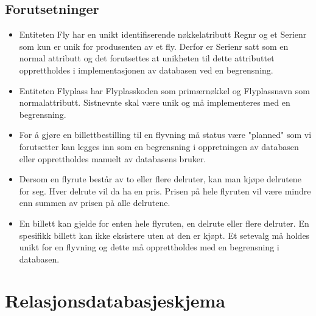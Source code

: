 \documentclass[a4paper,12pt, norsk]{article}
\begin{document}
\subsection{Forutsetninger}
\begin{itemize}
\item Entiteten Fly har en unikt identifiserende nøkkelatributt Regnr og et Serienr som kun er unik for produsenten av et fly. Derfor er Serienr satt som en normal attributt og det forutsettes at unikheten til dette attributtet opprettholdes i implementasjonen av databasen ved en begrensning.  
\item Entiteten Flyplass har Flyplasskoden som primærnøkkel og Flyplassnavn som normalattributt. Sistnevnte skal være unik og må implementeres med en begrensning.
\item For å gjøre en billettbestilling til en flyvning må status være "planned" som vi forutsetter kan legges inn som en begrensning i oppretningen av databasen eller opprettholdes manuelt av databasens bruker. 
\item Dersom en flyrute består av to eller flere delruter, kan man kjøpe delrutene for seg. Hver delrute vil da ha en pris. Prisen på hele flyruten vil være
mindre enn summen av prisen på alle delrutene. 
\item En billett kan gjelde for enten hele flyruten, en delrute eller flere delruter. En spesifikk billett kan ikke eksistere uten at den er kjøpt. Et setevalg må holdes unikt for en flyvning og dette må opprettholdes med en begrensning i databasen.
\end{itemize}

\newpage{}

\section{Relasjonsdatabasjeskjema}
\end{document}
